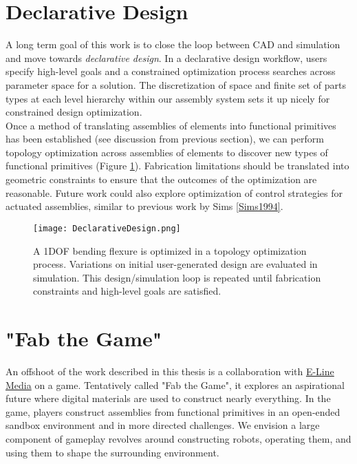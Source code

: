 {\section{Declarative Design}

A long term goal of this work is to close the loop between CAD and simulation and move towards \textit{declarative design}.  In a declarative design workflow, users specify high-level goals and a constrained optimization process searches across parameter space for a solution.  The discretization of space and finite set of parts types at each level hierarchy within our assembly system sets it up nicely for constrained design optimization.\\

Once a method of translating assemblies of elements into functional primitives has been established (see discussion from previous section), we can perform topology optimization across assemblies of elements to discover new types of functional primitives (Figure \ref{fig:DeclarativeDesign}).  Fabrication limitations should be translated into geometric constraints to ensure that the outcomes of the optimization are reasonable.  Future work could also explore optimization of control strategies for actuated assemblies, similar to previous work by Sims \ref{Sims1994}.

\begin{figure}
  \texttt{[image: DeclarativeDesign.png]}
  \caption{A 1DOF bending flexure is optimized in a topology optimization process.  Variations on initial user-generated design are evaluated in simulation.  This design/simulation loop is repeated until fabrication constraints and high-level goals are satisfied.}
  \label{fig:DeclarativeDesign}
\end{figure}

\section{"Fab the Game"}

An offshoot of the work described in this thesis is a collaboration with \href{http://elinemedia.com/}{E-Line Media} on a game.  Tentatively called "Fab the Game", it explores an aspirational future where digital materials are used to construct nearly everything.  In the game, players construct assemblies from functional primitives in an open-ended sandbox environment and in more directed challenges.  We envision a large component of gameplay revolves around constructing robots, operating them, and using them to shape the surrounding environment.\\

}
